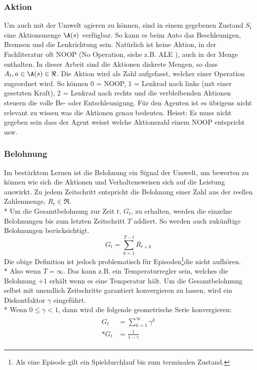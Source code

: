 \documentclass[a4paper,titlepage]{article}
\numberwithin{equation}{section} %
\begin{document}
\subsubsection{Aktion} \label{section:aktion}
Um auch mit der Umwelt agieren zu können, sind in einem gegebenen Zustand $S_{t}$ eine Aktionsmenge $\A(s)$ verfügbar. So kann es beim Auto das Beschleunigen, Bremsen und die Lenkrichtung sein. Natürlich ist keine Aktion, in der Fachliteratur oft NOOP (No Operation, siehe z.B. ALE \cite{Bellemare_2013}), auch in der Menge enthalten. In dieser Arbeit sind die Aktionen diskrete Mengen, so dass $A_{t}, a \in \A(s) \in \Re$. Die Aktion wird als Zahl aufgefasst, welcher einer Operation zugeordnet wird. So können 0 = NOOP, 1 = Lenkrad nach links (mit einer gesetzten Kraft), 2 = Lenkrad nach rechts und die verbleibenden Aktionen steuern die volle Be- oder Entschleunigung.
Für den Agenten ist es übrigens nicht relevant zu wissen was die Aktionen genau bedeuten. Heisst: Es muss nicht gegeben sein dass der Agent weisst welche Aktionszahl einem NOOP entspricht usw.

\subsubsection{Belohnung} \label{section:belohnung}
Im bestärktem Lernen ist die Belohnung ein Signal der Umwelt, um bewerten zu können wie sich die Aktionen und Verhaltensweisen sich auf die Leistung auswirkt. Zu jedem Zeitschritt entspricht die Belohnung einer Zahl aus der reellen Zahlenmenge, $R_t \in \Re$.\\*
Um die Gesamtbelohnung zur Zeit $t$, $G_t$, zu erhalten, werden die einzelne Belohnungen bis zum letzten Zeitschritt $T$ addiert. So werden auch zukünftige Belohnungen berücksichtigt.
\begin{equation}\label{eqn:gesamtbelohnung_undiskontiert}
	G_t =\sum_{k=1}^{T-t}R_{t+k}
\end{equation}
Die obige Definition ist jedoch problematisch für Episoden\footnote{Als eine Episode gilt ein Spieldurchlauf bis zum terminalen Zustand. }die nicht aufhören. \\*
Also wenn $T = \infty$. Das kann z.B. ein Temperaturregler sein, welches die Belohnung $+1$ erhält wenn es eine Temperatur hält. Um die Gesamtbelohnung selbst mit unendlich Zeitschritte garantiert konvergieren zu lassen, wird ein Diskontfaktor $\gamma$ eingeführt.\\* Wenn $0 \leq \gamma < 1$, dann wird die folgende geometrische Serie konvergieren:
\begin{align}
	\begin{split} \label{eqn:geometric_series}
		G_t &= \sum_{k=1}^{\infty}\gamma^{k} \\*
		G_t &= \frac{1}{1-\gamma}
	\end{split}
\end{align}
\end{document}

